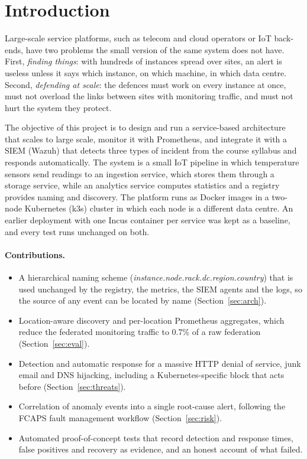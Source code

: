 \section{Introduction}
\label{sec:intro}

Large-scale service platforms, such as telecom and cloud operators or IoT back-ends, have two
problems the small version of the same system does not have. First, \emph{finding things}: with
hundreds of instances spread over sites, an alert is useless unless it says which instance, on
which machine, in which data centre. Second, \emph{defending at scale}: the defences must work on
every instance at once, must not overload the links between sites with monitoring traffic, and must
not hurt the system they protect.

The objective of this project is to design and run a service-based architecture that scales to
large scale, monitor it with Prometheus, and integrate it with a SIEM (Wazuh) that detects three
types of incident from the course syllabus and responds automatically. The system is a small IoT
pipeline in which temperature sensors send readings to an ingestion service, which stores them
through a storage service, while an analytics service computes statistics and a registry provides
naming and discovery. The platform runs as Docker images in a two-node Kubernetes (k3s) cluster in
which each node is a different data centre. An earlier deployment with one Incus container per
service was kept as a baseline, and every test runs unchanged on both.

\paragraph{Contributions.}
\begin{itemize}
  \item A hierarchical naming scheme (\emph{instance.node.rack.dc.region.country}) that is used
        unchanged by the registry, the metrics, the SIEM agents and the logs, so the source of any
        event can be located by name (Section~\ref{sec:arch}).
  \item Location-aware discovery and per-location Prometheus aggregates, which reduce the
        federated monitoring traffic to 0.7\% of a raw federation (Section~\ref{sec:eval}).
  \item Detection and automatic response for a massive HTTP denial of service, junk email and DNS
        hijacking, including a Kubernetes-specific block that acts before 
        (Section~\ref{sec:threats}).
  \item Correlation of anomaly events into a single root-cause alert, following the FCAPS fault
        management workflow (Section~\ref{sec:risk}).
  \item Automated proof-of-concept tests that record detection and response times, false
        positives and recovery as evidence, and an honest account of what failed.
\end{itemize}

